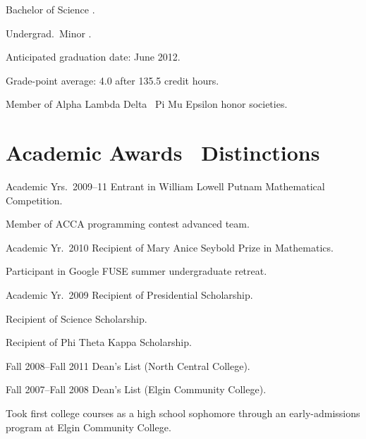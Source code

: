 \documentclass{bcatresume}
\begin{document}
  \maketitle

  \begin{topic}
    \item[Bachelor of Science] .

    \item[Undergrad.\ Minor] .

    \item Anticipated graduation date: June 2012.

    Grade-point average: 4.0 after 135.5 credit hours.

    Member of Alpha Lambda Delta \amp\ Pi Mu Epsilon honor societies.
  \end{topic}

  \section{Academic Awards \amp\ Distinctions}

  \begin{topic}
    \item[Academic Yrs.\ 2009--11] Entrant in William Lowell Putnam Mathematical Competition.

    Member of ACCA programming contest advanced team.

    \item[Academic Yr.\ 2010] Recipient of Mary Anice Seybold Prize in Mathematics.

    Participant in Google FUSE summer undergraduate retreat.

    \item[Academic Yr.\ 2009] Recipient of Presidential Scholarship.

    Recipient of Science Scholarship.

    Recipient of Phi Theta Kappa Scholarship.

    \item[Fall 2008--Fall 2011] Dean's List (North Central College).

    \item[Fall 2007--Fall 2008] Dean's List (Elgin Community College).

    \item Took first college courses as a high school sophomore through an early-admissions program at Elgin Community College.
  \end{topic}
\end{document}
